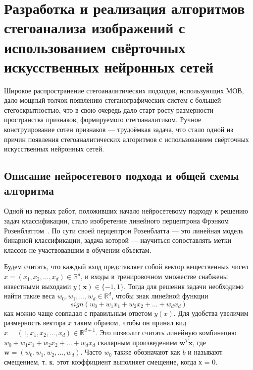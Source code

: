 
\section{Разработка и реализация алгоритмов стегоанализа изображений с использованием свёрточных искусственных нейронных сетей}

Широкое распространение стегоаналитических подходов, использующих МОВ, дало мощный толчок появлению стеганографических систем с большей стегоскрытностью, что в свою очередь дало старт росту размерности пространства признаков, формируемого стегоаналитиком. Ручное конструирование сотен признаков --- трудоёмкая задача, что стало одной из причин появления стегоаналитических алгоритмов с использованием свёрточных искусственных нейронных сетей.

\subsection{Описание нейросетевого подхода и общей схемы алгоритма}

Одной из первых работ, положивших начало нейросетевому подходу к решению задач классификации, стало изобретение линейного перцептрона Фрэнком Розенблаттом~\cite{Rosenblatt1, Rosenblatt2}. По сути своей перцептрон Розенблатта --- это линейная модель бинарной классификации, задача которой --- научиться сопоставлять метки классов не участвовавшим в обучении объектам.

Будем считать, что каждый вход представляет собой вектор вещественных чисел $ x = (x_1, x_2, \ldots, x_d) \in \mathbb{R}^d $, и входы в тренировочном множестве снабжены известными выходами $ y(\mathbf{x}) \in \{-1, 1\} $. Тогда для решения задачи необходимо найти такие веса $ w_0, w_1, \ldots, w_d \in \mathbb{R}^d $, чтобы знак линейной функции
\begin{equation*}
sign(w_0 + w_1x_1 + w_2x_2 + \ldots + w_dx_d)
\end{equation*}
как можно чаще совпадал с правильным ответом $ y(x) $. Для удобства увеличим размерность вектора $ x $ таким образом, чтобы он принял вид $ x = (1, x_1, x_2, \ldots, x_d) \in \mathbb{R}^{d + 1} $. Это позволит считать линейную комбинацию $ w_0 + w_1x_1 + w_2x_2 + \ldots + w_dx_d $ скалярным произведением $ \mathbf{w}^T\mathbf{x} $, где $ \mathbf{w} = (w_0, w_1, w_2, \ldots, w_d) $. Часто $ w_0 $ также обозначают как $ b $ и называют смещением, т. к. этот коэффициент выполняет смещение, когда х = 0.

